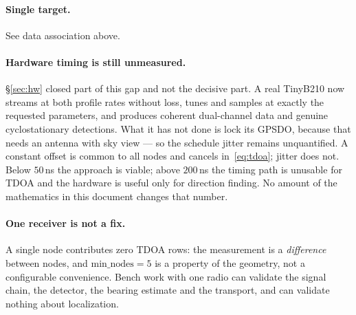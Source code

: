 \documentclass[11pt,a4paper]{article}
\begin{document}
\paragraph{Single target.} See data association above.

\paragraph{Hardware timing is still unmeasured.} \S\ref{sec:hw} closed part of
this gap and not the decisive part. A real TinyB210 now streams at both
profile rates without loss, tunes and samples at exactly the requested
parameters, and produces coherent dual-channel data and genuine
cyclostationary detections. What it has not done is lock its GPSDO, because
that needs an antenna with sky view --- so the schedule jitter remains
unquantified. A constant offset is common to all nodes and cancels
in~\eqref{eq:tdoa}; jitter does not. Below $50$\,ns the approach is viable;
above $200$\,ns the timing path is unusable for TDOA and the hardware is
useful only for direction finding. No amount of the mathematics in this
document changes that number.

\paragraph{One receiver is not a fix.} A single node contributes zero TDOA
rows: the measurement is a \emph{difference} between nodes, and
$\text{min\_nodes}=5$ is a property of the geometry, not a configurable
convenience. Bench work with one radio can validate the signal chain, the
detector, the bearing estimate and the transport, and can validate nothing
about localization.
\end{document}
